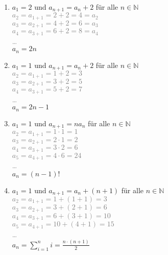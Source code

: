 \documentclass[a4paper]{article}
\begin{document}
\begin{enumerate}
    \item $a_1 = 2$ und $a_{n+1} = a_n + 2$ für alle $n \in \mathbb{N}$\\
    \textcolor{gray}{$a_2=a_{1+1}=2+2=4=a_2$}\\
    \textcolor{gray}{$a_3=a_{2+1}=4+2=6=a_3$}\\
    \textcolor{gray}{$a_4=a_{3+1}=6+2=8=a_4$}\\
    \textcolor{gray}{\dots}\\
    \(a_n=2n\)
    \item $a_1 = 1$ und $a_{n+1} = a_n + 2$ für alle $n \in \mathbb{N}$\\
    \textcolor{gray}{$a_2=a_{1+1}=1+2=3$}\\
    \textcolor{gray}{$a_3=a_{2+1}=3+2=5$}\\
    \textcolor{gray}{$a_4=a_{3+1}=5+2=7$}\\
    \textcolor{gray}{\dots}\\
    \(a_n=2n-1\)
    \item $a_1 = 1$ und $a_{n+1} = na_n$ für alle $n \in \mathbb{N}$\\
    \textcolor{gray}{$a_2=a_{1+1}=1\cdot 1=1$}\\
    \textcolor{gray}{$a_3=a_{2+1}=2\cdot 1=2$}\\
    \textcolor{gray}{$a_4=a_{3+1}=3\cdot 2=6$}\\
    \textcolor{gray}{$a_5=a_{4+1}=4\cdot 6=24$}\\
    \textcolor{gray}{\dots}\\
    \(a_n=(n-1)!\)
    \item $a_1 = 1$ und $a_{n+1} = a_n + (n + 1)$ für alle $n \in \mathbb{N}$\\
    \textcolor{gray}{$a_2=a_{1+1}=1+(1+1)=3$}\\
    \textcolor{gray}{$a_3=a_{2+1}=3+(2+1)=6$}\\
    \textcolor{gray}{$a_4=a_{3+1}=6+(3+1)=10$}\\
    \textcolor{gray}{$a_5=a_{4+1}=10+(4+1)=15$}\\
    \textcolor{gray}{\dots}\\
    \(a_n=\sum\limits^n_{i=1}i=\frac{n\cdot (n+1)}{2}\)
\end{enumerate}
\end{document}
